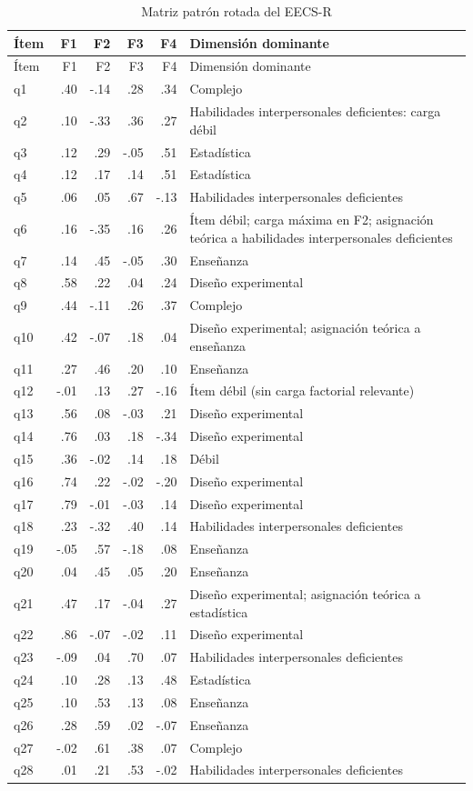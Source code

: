 \documentclass[12pt,letterpaper]{article}
\begin{document}
\begin{longtable}{lrrrr>{\raggedright\arraybackslash}p{4.2cm}}
\caption{Matriz patrón rotada del EECS-R}\\
\toprule
Ítem & F1 & F2 & F3 & F4 & Dimensión dominante \\
\midrule
\endfirsthead
\toprule
Ítem & F1 & F2 & F3 & F4 & Dimensión dominante \\
\midrule
\endhead
q1 & .40 & -.14 & .28 & .34 & Complejo \\
q2 & .10 & -.33 & .36 & .27 & Habilidades interpersonales deficientes: carga débil \\
q3 & .12 & .29 & -.05 & .51 & Estadística \\
q4 & .12 & .17 & .14 & .51 & Estadística \\
q5 & .06 & .05 & .67 & -.13 & Habilidades interpersonales deficientes \\
q6 & .16 & -.35 & .16 & .26 & Ítem débil; carga máxima en F2; asignación teórica a habilidades interpersonales deficientes \\
q7 & .14 & .45 & -.05 & .30 & Enseñanza \\
q8 & .58 & .22 & .04 & .24 & Diseño experimental \\
q9 & .44 & -.11 & .26 & .37 & Complejo \\
q10 & .42 & -.07 & .18 & .04 & Diseño experimental; asignación teórica a enseñanza \\
q11 & .27 & .46 & .20 & .10 & Enseñanza \\
q12 & -.01 & .13 & .27 & -.16 & Ítem débil (sin carga factorial relevante) \\
q13 & .56 & .08 & -.03 & .21 & Diseño experimental \\
q14 & .76 & .03 & .18 & -.34 & Diseño experimental \\
q15 & .36 & -.02 & .14 & .18 & Débil \\
q16 & .74 & .22 & -.02 & -.20 & Diseño experimental \\
q17 & .79 & -.01 & -.03 & .14 & Diseño experimental \\
q18 & .23 & -.32 & .40 & .14 & Habilidades interpersonales deficientes \\
q19 & -.05 & .57 & -.18 & .08 & Enseñanza \\
q20 & .04 & .45 & .05 & .20 & Enseñanza \\
q21 & .47 & .17 & -.04 & .27 & Diseño experimental; asignación teórica a estadística \\
q22 & .86 & -.07 & -.02 & .11 & Diseño experimental \\
q23 & -.09 & .04 & .70 & .07 & Habilidades interpersonales deficientes \\
q24 & .10 & .28 & .13 & .48 & Estadística \\
q25 & .10 & .53 & .13 & .08 & Enseñanza \\
q26 & .28 & .59 & .02 & -.07 & Enseñanza \\
q27 & -.02 & .61 & .38 & .07 & Complejo \\
q28 & .01 & .21 & .53 & -.02 & Habilidades interpersonales deficientes \\
\bottomrule
\end{longtable}
\end{document}
